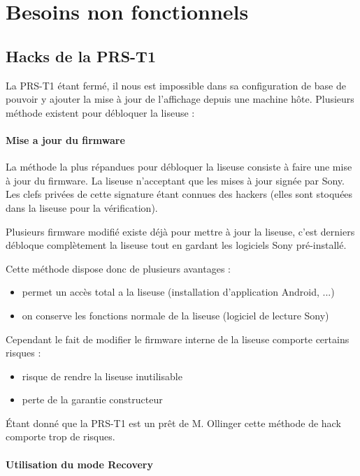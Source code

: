 \chapter{Besoins non fonctionnels}
\section{Hacks de la PRS-T1}

La PRS-T1 étant fermé, il nous est impossible dans sa configuration de base de pouvoir y ajouter la mise à jour 
de l'affichage depuis une machine hôte.
Plusieurs méthode existent pour débloquer la liseuse : 

\subsubsection{Mise a jour du firmware}

La méthode la plus répandues pour débloquer la liseuse consiste à faire une mise à jour du firmware.
La liseuse n'acceptant que les mises à jour signée par Sony. Les clefs privées de cette signature étant connues des hackers (elles sont stoquées dans la liseuse pour la vérification).

Plusieurs firmware modifié existe déjà pour mettre à jour la liseuse, c'est derniers débloque complètement la liseuse tout en gardant les logiciels Sony pré-installé.

Cette méthode dispose donc de plusieurs avantages : 
	\begin{itemize}
		\item permet un accès total a la liseuse (installation d'application Android, ...)
		\item on conserve les fonctions normale de la liseuse (logiciel de lecture Sony)
	\end{itemize}
Cependant le fait de modifier le firmware interne de la liseuse comporte certains risques : 
	\begin{itemize}
		\item risque de rendre la liseuse inutilisable
		\item perte de la garantie constructeur
	\end{itemize}

Étant donné que la PRS-T1 est un prêt de M. Ollinger cette méthode de hack comporte trop de risques.

\subsubsection{Utilisation du mode Recovery}

